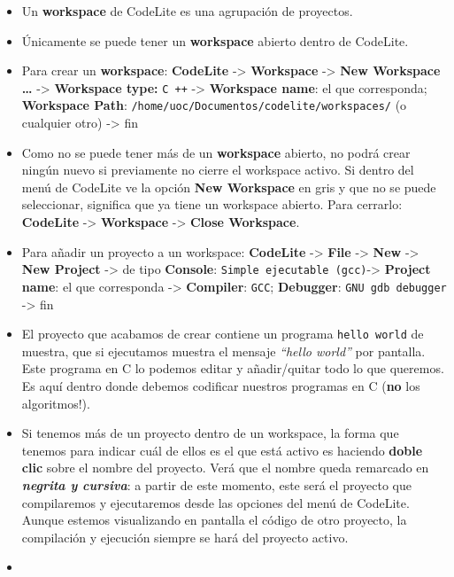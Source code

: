 \documentclass[
]{book}
\providecommand{\tightlist}{%
  \setlength{\itemsep}{0pt}\setlength{\parskip}{0pt}}
\begin{document}
\begin{itemize}
\tightlist
\item
  Un \textbf{workspace} de CodeLite es una agrupación de proyectos.
\item
  Únicamente se puede tener un \textbf{workspace} abierto dentro de CodeLite.
\item
  Para crear un \textbf{workspace}: \textbf{CodeLite} -\textgreater{} \textbf{Workspace} -\textgreater{} \textbf{New Workspace \ldots{}} -\textgreater{} \textbf{Workspace type:} \texttt{C\ ++} -\textgreater{} \textbf{Workspace name}: el que corresponda; \textbf{Workspace Path}: \texttt{/home/uoc/Documentos/codelite/workspaces/} (o cualquier otro) -\textgreater{} fin
\item
  Como no se puede tener más de un \textbf{workspace} abierto, no podrá crear ningún nuevo si previamente no cierre el workspace activo. Si dentro del menú de CodeLite ve la opción \textbf{New Workspace} en gris y que no se puede seleccionar, significa que ya tiene un workspace abierto. Para cerrarlo: \textbf{CodeLite} -\textgreater{} \textbf{Workspace} -\textgreater{} \textbf{Close Workspace}.
\item
  Para añadir un proyecto a un workspace: \textbf{CodeLite} -\textgreater{} \textbf{File} -\textgreater{} \textbf{New} -\textgreater{} \textbf{New Project} -\textgreater{} de tipo \textbf{Console}: \texttt{Simple\ ejecutable\ (gcc)}-\textgreater{} \textbf{Project name}: el que corresponda -\textgreater{} \textbf{Compiler}: \texttt{GCC}; \textbf{Debugger}: \texttt{GNU\ gdb\ debugger} -\textgreater{} fin
\item
  El proyecto que acabamos de crear contiene un programa \texttt{hello\ world} de muestra, que si ejecutamos muestra el mensaje \emph{``hello world''} por pantalla. Este programa en C lo podemos editar y añadir/quitar todo lo que queremos. Es aquí dentro donde debemos codificar nuestros programas en C (\textbf{no} los algoritmos!).
\item
  Si tenemos más de un proyecto dentro de un workspace, la forma que tenemos para indicar cuál de ellos es el que está activo es haciendo \textbf{doble clic} sobre el nombre del proyecto. Verá que el nombre queda remarcado en \textbf{\emph{negrita y cursiva}}: a partir de este momento, este será el proyecto que compilaremos y ejecutaremos desde las opciones del menú de CodeLite. Aunque estemos visualizando en pantalla el código de otro proyecto, la compilación y ejecución siempre se hará del proyecto activo.
\item

\end{itemize}
\end{document}
